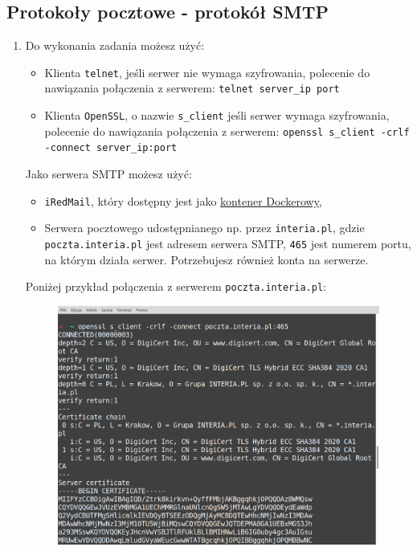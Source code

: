 \subsection*{Protokoły pocztowe - protokół SMTP}
\begin{enumerate}[label=\textbf{6.\arabic*}]\setlength{\itemsep}{1em}
\item \label{answ61} Do wykonania zadania możesz użyć:
\begin{itemize}
	\item Klienta \texttt{telnet}, jeśli serwer nie wymaga szyfrowania, polecenie do nawiązania połączenia z serwerem: \texttt{telnet server\_ip port}
	\item Klienta \texttt{OpenSSL}, o nazwie \texttt{s\_client} jeśli serwer wymaga szyfrowania, polecenie do nawiązania połączenia z serwerem: \texttt{openssl s\_client -crlf -connect server\_ip:port}
\end{itemize}
\noindent Jako serwera SMTP możesz użyć:
\begin{itemize}
 \item \texttt{iRedMail}, który dostępny jest jako \href{https://hub.docker.com/r/iredmail/mariadb}{kontener Dockerowy}, 
 \item Serwera pocztowego udostępnianego np. przez \texttt{interia.pl}, gdzie \texttt{poczta.interia.pl} jest adresem serwera SMTP, \texttt{465} jest numerem portu, na którym działa serwer. Potrzebujesz również konta na serwerze.
 \end{itemize}
 \noindent Poniżej przykład połączenia z serwerem \texttt{poczta.interia.pl}:
 \begin{figure}[h]
\centering
\includegraphics[scale=0.25]{./images/answers/smtp1.png}

\end{figure}
\end{enumerate}
